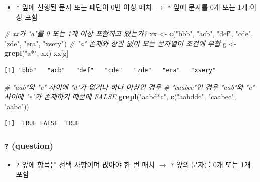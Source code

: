 \documentclass[
  11pt,
]{krantz}
\newenvironment{Shaded}{\begin{snugshade}}{\end{snugshade}}
\newcommand{\CommentTok}[1]{\textcolor[rgb]{0.37,0.37,0.37}{\textit{#1}}}
\newcommand{\KeywordTok}[1]{\textcolor[rgb]{0.27,0.27,0.27}{\textbf{#1}}}
\newcommand{\NormalTok}[1]{#1}
\newcommand{\StringTok}[1]{\textcolor[rgb]{0.5,0.5,0.5}{#1}}
\providecommand{\tightlist}{%
  \setlength{\itemsep}{0pt}\setlength{\parskip}{0pt}}
\begin{document}
\begin{itemize}
\tightlist
\item
  \texttt{*} 앞에 선행된 문자 또는 패턴이 0번 이상 매치 \(\rightarrow\) \texttt{*} 앞에 문자를 0개 또는 1개 이상 포함
\end{itemize}

\footnotesize

\begin{Shaded}
\begin{Highlighting}[]
\CommentTok{# xx가 "a"를 0 또는 1개 이상 포함하고 있는가?}
\NormalTok{xx <-}\StringTok{ }\KeywordTok{c}\NormalTok{(}\StringTok{"bbb"}\NormalTok{, }\StringTok{"acb"}\NormalTok{, }\StringTok{"def"}\NormalTok{, }\StringTok{"cde"}\NormalTok{, }\StringTok{"zde"}\NormalTok{, }\StringTok{"era"}\NormalTok{, }\StringTok{"xsery"}\NormalTok{)}
\CommentTok{# "a" 존재와 상관 없이 모든 문자열이 조건에 부합}
\NormalTok{g <-}\StringTok{ }\KeywordTok{grepl}\NormalTok{(}\StringTok{"a*"}\NormalTok{, xx)}
\NormalTok{xx[g]}
\end{Highlighting}
\end{Shaded}

\begin{verbatim}
[1] "bbb"   "acb"   "def"   "cde"   "zde"   "era"   "xsery"
\end{verbatim}

\begin{Shaded}
\begin{Highlighting}[]
\CommentTok{# "aab"와 "c" 사이에 "d"가 없거나 하나 이상인 경우 }
\CommentTok{# "caabec"인 경우 "aab"와 "c" 사이에 "e"가 존재하기 때문에 FALSE}
\KeywordTok{grepl}\NormalTok{(}\StringTok{"aabd*c"}\NormalTok{, }\KeywordTok{c}\NormalTok{(}\StringTok{"aabddc"}\NormalTok{, }\StringTok{"caabec"}\NormalTok{, }\StringTok{"aabc"}\NormalTok{))}
\end{Highlighting}
\end{Shaded}

\begin{verbatim}
[1]  TRUE FALSE  TRUE
\end{verbatim}

\normalsize

\hypertarget{question}{%
\subsubsection*{\texorpdfstring{\textbf{\texttt{?} (question)}}{? (question)}}\label{question}}


\begin{itemize}
\tightlist
\item
  \texttt{?} 앞에 항목은 선택 사항이며 많아야 한 번 매치 \(\rightarrow\) \texttt{?} 앞의 문자를 0개 또는 1개 포함
\end{itemize}
\end{document}
